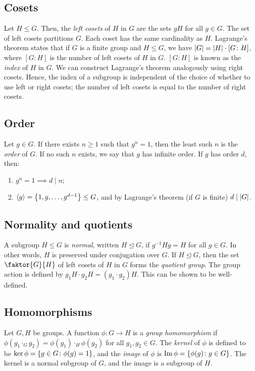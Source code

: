 \subsection{Cosets}
Let \( H \leq G \).
Then, the \textit{left cosets} of \( H \) in \( G \) are the sets \( gH \) for all \( g \in G \).
The set of left cosets partitions \( G \).
Each coset has the same cardinality as \( H \).
Lagrange's theorem states that if \( G \) is a finite group and \( H \leq G \), we have \( \abs{G} = \abs{H} \cdot [G \colon H] \), where \( [G \colon H] \) is the number of left cosets of \( H \) in \( G \).
\( [G \colon H] \) is known as the \textit{index} of \( H \) in \( G \).
We can construct Lagrange's theorem analogously using right cosets.
Hence, the index of a subgroup is independent of the choice of whether to use left or right cosets; the number of left cosets is equal to the number of right cosets.

\subsection{Order}
Let \( g \in G \).
If there exists \( n \geq 1 \) such that \( g^n = 1 \), then the least such \( n \) is the \textit{order} of \( G \).
If no such \( n \) exists, we say that \( g \) has infinite order.
If \( g \) has order \( d \), then:
\begin{enumerate}
	\item \( g^n = 1 \implies d \mid n \);
	\item \( \langle{} g \rangle = \qty{1, g, \dots, g^{d-1}} \leq G \), and by Lagrange's theorem (if \( G \) is finite) \( d \mid \abs{G} \).
\end{enumerate}

\subsection{Normality and quotients}
A subgroup \( H \leq G \) is \textit{normal}, written \( H \trianglelefteq G \), if \( g^{-1} H g = H \) for all \( g \in G \).
In other words, \( H \) is preserved under conjugation over \( G \).
If \( H \trianglelefteq G \), then the set \( \faktor{G}{H} \) of left cosets of \( H \) in \( G \) forms the \textit{quotient group}.
The group action is defined by \( g_1 H \cdot g_2 H = (g_1 \cdot g_2) H \).
This can be shown to be well-defined.

\subsection{Homomorphisms}
Let \( G, H \) be groups.
A function \( \phi \colon G \to H \) is a \textit{group homomorphism} if \( \phi(g_1 \cdot_G g_2) = \phi(g_1) \cdot_H \phi(g_2) \) for all \( g_1, g_2 \in G \).
The \textit{kernel} of \( \phi \) is defined to be \( \ker \phi = \qty{g \in G \colon \phi(g) = 1} \), and the \textit{image} of \( \phi \) is \( \Im \phi = \qty{\phi(g) \colon g \in G} \).
The kernel is a normal subgroup of \( G \), and the image is a subgroup of \( H \).

